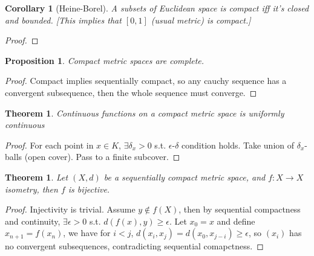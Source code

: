 \documentclass{article}
\theoremstyle{definition}
\theoremstyle{remark}
\theoremstyle{plain}
\newtheorem{thm}[defn]{Theorem}
\newtheorem{prop}[defn]{Proposition}
\newtheorem{crly}[defn]{Corollary}
\theoremstyle{definition}
\begin{document}
\begin{crly}[Heine-Borel]
    A subsets of Euclidean space is compact iff it's closed and bounded.
    [This implies that $[0,1]$ (usual metric) is compact.]
\end{crly}
\begin{proof}
    
\end{proof}
\begin{prop}
    Compact metric spaces are complete.
\end{prop}
\begin{proof}
    Compact implies sequentially compact, so any cauchy sequence has a convergent subsequence, then the whole sequence must converge.
\end{proof}
\begin{thm}
    Continuous functions on a compact metric space is uniformly continuous
\end{thm}
\begin{proof}
    For each point in $x\in K$, $\exists \delta_x>0$ s.t. $\epsilon$-$\delta$ condition holds. Take union of $\delta_x$-balls (open cover). Pass to a finite subcover.
\end{proof}
\begin{thm}
Let $(X,d)$ be a sequentially compact metric space, and $f:X\to X$ isometry, then $f$ is bijective.    
\end{thm}
\begin{proof}
    Injectivity is trivial. Assume $y\not\in f(X)$, then by sequential compactness and continuity, $\exists\epsilon>0$ s.t. $d(f(x),y)\ge\epsilon$. Let $x_0=x$ and define $x_{n+1}=f(x_n)$, we have for $i<j$, $d(x_i,x_j)=d(x_0,x_{j-i})\ge \epsilon$, so $(x_i)$ has no convergent subsequences, contradicting sequential comapctness.
\end{proof}
\end{document}
